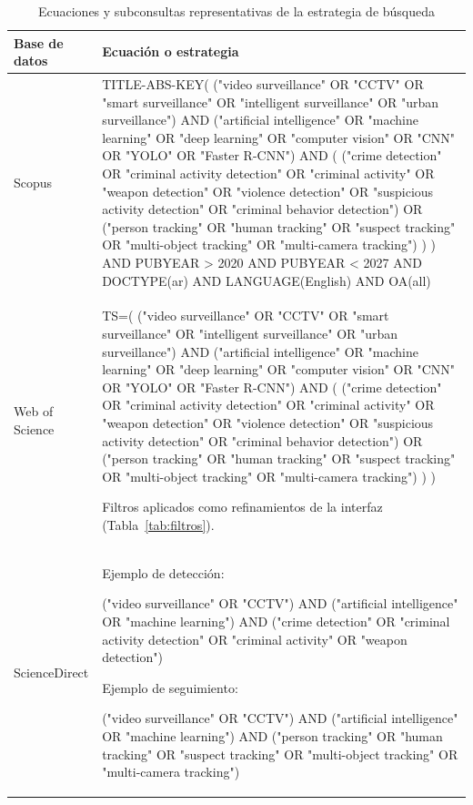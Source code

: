 \documentclass[pdflatex,sn-mathphys-num]{sn-jnl}%
\theoremstyle{thmstyleone}%
\theoremstyle{thmstyletwo}%
\theoremstyle{thmstylethree}%
\begin{document}
\begin{table}[htbp]
\caption{Ecuaciones y subconsultas representativas de la estrategia de búsqueda}\label{tab:ecuaciones}
\begin{tabular}{@{}L{2.2cm}L{10.3cm}@{}}
\toprule
Base de datos & Ecuación o estrategia \\
\midrule
Scopus & {\footnotesize\ttfamily TITLE-ABS-KEY( ("video surveillance" OR "CCTV" OR "smart surveillance" OR "intelligent surveillance" OR "urban surveillance") AND ("artificial intelligence" OR "machine learning" OR "deep learning" OR "computer vision" OR "CNN" OR "YOLO" OR "Faster R-CNN") AND ( ("crime detection" OR "criminal activity detection" OR "criminal activity" OR "weapon detection" OR "violence detection" OR "suspicious activity detection" OR "criminal behavior detection") OR ("person tracking" OR "human tracking" OR "suspect tracking" OR "multi-object tracking" OR "multi-camera tracking") ) ) AND PUBYEAR > 2020 AND PUBYEAR < 2027 AND DOCTYPE(ar) AND LANGUAGE(English) AND OA(all)\par} \\
\addlinespace
Web of Science & {\footnotesize\ttfamily TS=( ("video surveillance" OR "CCTV" OR "smart surveillance" OR "intelligent surveillance" OR "urban surveillance") AND ("artificial intelligence" OR "machine learning" OR "deep learning" OR "computer vision" OR "CNN" OR "YOLO" OR "Faster R-CNN") AND ( ("crime detection" OR "criminal activity detection" OR "criminal activity" OR "weapon detection" OR "violence detection" OR "suspicious activity detection" OR "criminal behavior detection") OR ("person tracking" OR "human tracking" OR "suspect tracking" OR "multi-object tracking" OR "multi-camera tracking") ) )\par}\smallskip
{\footnotesize Filtros aplicados como refinamientos de la interfaz (Tabla~\ref{tab:filtros}).\par} \\
\addlinespace
ScienceDirect & {\footnotesize Ejemplo de detección:\par}
{\footnotesize\ttfamily ("video surveillance" OR "CCTV") AND ("artificial intelligence" OR "machine learning") AND ("crime detection" OR "criminal activity detection" OR "criminal activity" OR "weapon detection")\par}\smallskip
{\footnotesize Ejemplo de seguimiento:\par}
{\footnotesize\ttfamily ("video surveillance" OR "CCTV") AND ("artificial intelligence" OR "machine learning") AND ("person tracking" OR "human tracking" OR "suspect tracking" OR "multi-object tracking" OR "multi-camera tracking")\par} \\
\bottomrule
\end{tabular}
\end{table}
\end{document}
